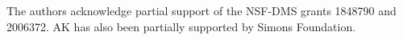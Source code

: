 \documentclass[12pt,reqno]{amsart}
\begin{document}
 \rm The authors acknowledge partial support of the NSF-DMS grants 1848790 and 2006372. AK has also been partially supported by Simons Foundation. 
%
%
\begin{thebibliography}{[MT]}













\end{thebibliography}
\end{document}
